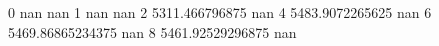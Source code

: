 0 nan nan
1 nan nan
2 5311.466796875 nan
4 5483.9072265625 nan
6 5469.86865234375 nan
8 5461.92529296875 nan
